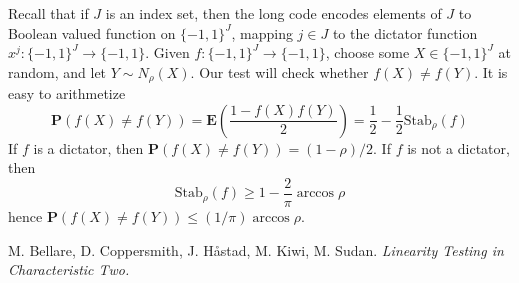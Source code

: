 Recall that if $J$ is an index set, then the long code encodes elements of $J$ to Boolean valued function on $\{ -1, 1 \}^J$, mapping $j \in J$ to the dictator function $x^j: \{ -1, 1 \}^J \to \{ -1, 1 \}$. Given $f: \{ -1, 1 \}^J \to \{ -1, 1 \}$, choose some $X \in \{ -1, 1 \}^J$ at random, and let $Y \sim N_{\rho}(X)$. Our test will check whether $f(X) \neq f(Y)$. It is easy to arithmetize
%
\[ \mathbf{P}(f(X) \neq f(Y)) = \mathbf{E} \left( \frac{1 - f(X)f(Y)}{2} \right) = \frac{1}{2} - \frac{1}{2} \text{Stab}_\rho(f) \]
%
If $f$ is a dictator, then $\mathbf{P}(f(X) \neq f(Y)) = (1 - \rho)/2$. If $f$ is not a dictator, then
%
\[ \text{Stab}_\rho(f) \geq 1 - \frac{2}{\pi} \arccos \rho \]
%
hence $\mathbf{P}(f(X) \neq f(Y)) \leq (1/\pi) \arccos \rho$.


\begin{thebibliography}{9}

M. Bellare, D. Coppersmith, J. H\r{a}stad, M. Kiwi, M. Sudan.
\textit{Linearity Testing in Characteristic Two.}

\end{thebibliography}

